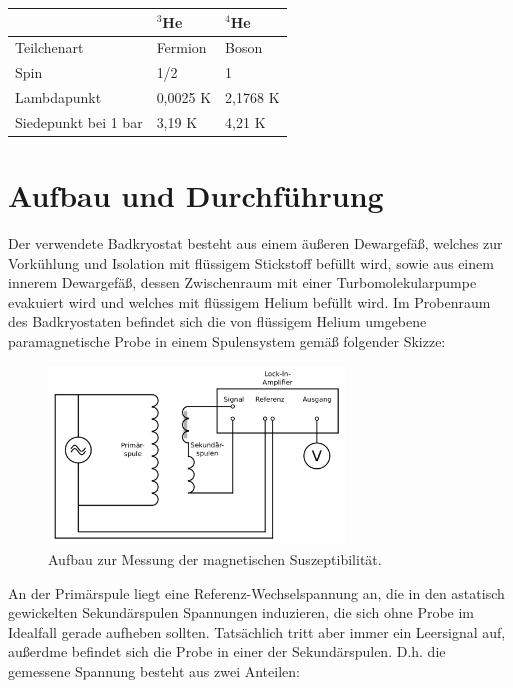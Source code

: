 \documentclass[bigchapter,colorback,accentcolor=tud4b,linedtoc,11pt]{tudreport}
\begin{document}
\begin{center}
  \begin{tabular}{|p{5cm}|p{3cm}|p{3cm}|}
    \hline
    & $^3$He & $^4$He \\ \hline
    Teilchenart & Fermion & Boson  \\ \hline
    Spin & 1/2 & 1  \\ \hline
    Lambdapunkt & 0,0025 K & 2,1768 K  \\ \hline
    Siedepunkt bei 1 bar & 3,19 K & 4,21 K  \\ \hline
	\end{tabular}
\end{center}

\chapter{Aufbau und Durchführung}

Der verwendete Badkryostat besteht aus einem äußeren Dewargefäß, welches zur Vorkühlung und Isolation mit flüssigem Stickstoff befüllt wird, sowie aus einem innerem Dewargefäß, dessen Zwischenraum mit einer Turbomolekularpumpe evakuiert wird und welches mit flüssigem Helium befüllt wird. Im Probenraum des Badkryostaten befindet sich die von flüssigem Helium umgebene paramagnetische Probe in einem Spulensystem gemäß folgender Skizze: 

\begin{figure}[h] 
  \centering
     \includegraphics[width=0.7\textwidth]{data/Aufbau.jpg}
  \caption{Aufbau zur Messung der magnetischen Suszeptibilität. \cite{anleitung}}  
  \label{fig:Bild1}
\end{figure}


An der Primärspule liegt eine Referenz-Wechselspannung an, die in den astatisch gewickelten Sekundärspulen Spannungen induzieren, die sich ohne Probe im Idealfall gerade aufheben sollten. Tatsächlich tritt aber immer ein Leersignal auf, außerdme befindet sich die Probe in einer der Sekundärspulen. D.h. die gemessene Spannung besteht aus zwei Anteilen: 
\end{document}
